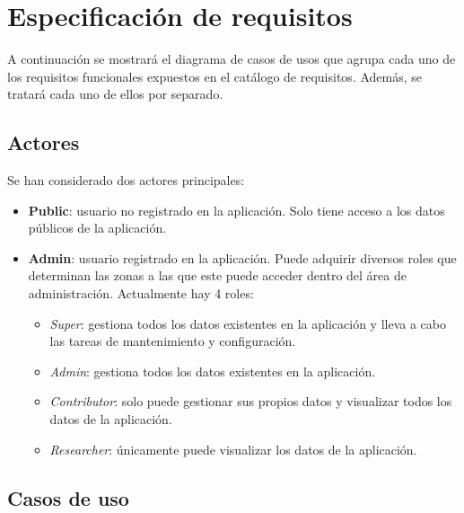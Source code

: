 \section{Especificación de requisitos}

A continuación se mostrará el diagrama de casos de usos que agrupa cada
uno de los requisitos funcionales expuestos en el catálogo de
requisitos. Además, se tratará cada uno de ellos por separado.


\subsection{Actores}

Se han considerado dos actores principales:

\begin{itemize}
\tightlist
\item
  \textbf{Public}: usuario no registrado en la aplicación. Solo tiene acceso a los datos públicos de la aplicación.
\item
  \textbf{Admin}: usuario registrado en la aplicación. Puede adquirir diversos roles que determinan las zonas a las que este puede acceder dentro del área de administración. Actualmente hay 4 roles:
  \begin{itemize}
  \tightlist
  \item
    \emph{Super}: gestiona todos los datos existentes en la aplicación y lleva a cabo las tareas de mantenimiento y configuración.
  \item
    \emph{Admin}: gestiona todos los datos existentes en la aplicación.
  \item
    \emph{Contributor}: solo puede gestionar sus propios datos y visualizar todos los datos de la aplicación.
  \item
    \emph{Researcher}: únicamente puede visualizar los datos de la aplicación.
  \end{itemize}
\end{itemize}

\subsection{Casos de uso}


